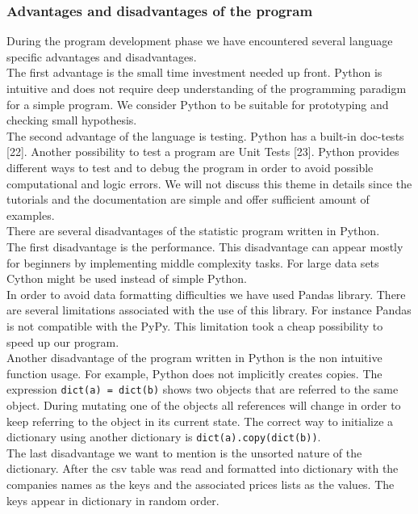 \documentclass [twoside,
  11pt, a4paper,
  footinclude=true,
  headinclude=true,
  cleardoublepage=empty
]{article}
\begin{document}
\subsubsection{Advantages and disadvantages of the program}
During the program development phase we have encountered several language specific advantages and disadvantages.\\
The first advantage is the small time investment needed up front. Python is intuitive and does not require deep understanding of the programming paradigm for a simple program. We consider Python to be suitable for prototyping and checking small hypothesis.\\
The second advantage of the language is testing. Python has a built-in doc-tests [22]. Another possibility to test a program are Unit Tests [23]. Python provides different ways to test and to debug the program in order to avoid possible computational and logic errors. We will not discuss this theme in details since the tutorials and the documentation are simple and offer sufficient amount of examples.\\
There are several disadvantages of the statistic program written in Python.\\ 
The first disadvantage is the performance. This disadvantage can appear mostly for beginners by implementing middle complexity tasks. For large data sets Cython might be used instead of simple Python.\\
In order to avoid data formatting difficulties we have used Pandas library. There are several limitations associated with the use of this library. For instance Pandas is not compatible with the PyPy. This limitation took a cheap possibility to speed up our program.\\
Another disadvantage of the program written in Python is the non intuitive function usage. For example, Python does not implicitly creates copies. The expression \texttt{dict(a) = dict(b)} shows two objects that are referred to the same object. During mutating one of the objects all references will change in order to keep referring to the object in its current state. The correct way to initialize a dictionary using another dictionary is \texttt{dict(a).copy(dict(b))}. \\
The last disadvantage we want to mention is the unsorted nature of the dictionary. After the csv table was read and formatted into dictionary with the companies names as the keys and the associated prices lists as the values. The keys appear in dictionary in random order.
\end{document}
